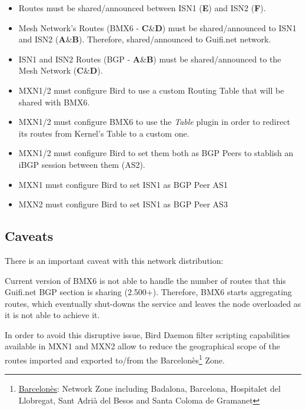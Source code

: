 \begin{itemize}
    \item Routes must be shared/announced between ISN1 (\textbf{E}) and ISN2 (\textbf{F}).
    \item Mesh Network's Routes (BMX6 - \textbf{C}\&\textbf{D}) must be shared/announced to ISN1 and ISN2 (\textbf{A}\&\textbf{B}). Therefore, shared/announced to Guifi.net network.
    \item ISN1 and ISN2 Routes (BGP - \textbf{A}\&\textbf{B}) must be shared/announced to the Mesh Network (\textbf{C}\&\textbf{D}).
    \item MXN1/2 must configure Bird to use a custom Routing Table that will be shared with BMX6.
    \item MXN1/2 must configure BMX6 to use the \textit{Table} plugin in order to redirect its routes from Kernel's Table to a custom one.
    \item MXN1/2 must configure Bird to set them both as BGP Peers to stablish an iBGP session between them (AS2).
    \item MXN1 must configure Bird to set ISN1 as BGP Peer AS1
    \item MXN2 must configure Bird to set ISN1 as BGP Peer AS3
\end{itemize}

\subsection{Caveats}
There is an important caveat with this network distribution:

Current version of BMX6 is not able to handle the number of routes that this Guifi.net BGP section is sharing (2.500+). Therefore, BMX6 starts aggregating routes, which eventually shut-downs the service and leaves the node overloaded as it is not able to achieve it.

In order to avoid this disruptive issue, Bird Daemon filter scripting capabilities available in MXN1 and MXN2 allow to reduce the geographical scope of the routes imported and exported to/from the Barcelon\`{e}s\footnote{\href{https://guifi.net/barcelones}{Barcelon\`{e}s}: Network Zone including Badalona, Barcelona, Hospitalet del Llobregat, Sant Adri\`{a} del Besos and Santa Coloma de Gramanet} Zone.

